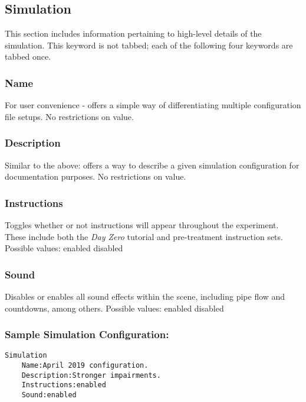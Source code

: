 \documentclass{article}
\begin{document}
\subsection{Simulation}
This section includes information pertaining to high-level details of the simulation. This keyword is not tabbed; each of the following four keywords are tabbed once.

\subsubsection{Name} For user convenience - offers a simple way of differentiating multiple configuration file setups. No restrictions on value. 

\subsubsection{Description} Similar to the above: offers a way to describe a given simulation configuration for documentation purposes. No restrictions on value. 

\subsubsection{Instructions} Toggles whether or not instructions will appear throughout the experiment. These include both the \textit{Day Zero} tutorial and pre-treatment instruction sets.
\newline \indent Possible values: \newline
\indent\indent enabled \newline
\indent\indent disabled

\subsubsection{Sound} Disables or enables all sound effects within the scene, including pipe flow and countdowns, among others.
\newline \indent Possible values: \newline
\indent\indent enabled \newline
\indent\indent disabled

\pagebreak\subsubsection{Sample Simulation Configuration:}
\begin{lstlisting}
Simulation
    Name:April 2019 configuration.
    Description:Stronger impairments.
    Instructions:enabled
    Sound:enabled
\end{lstlisting} 
\end{document}
